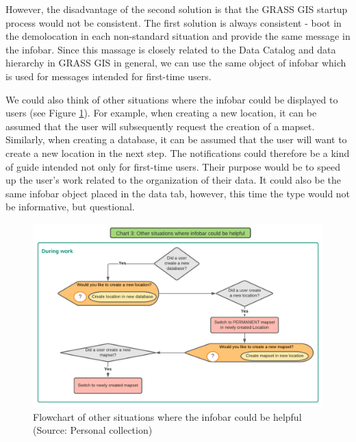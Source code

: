 \documentclass[a4paper,10pt,twoside]{article}
\begin{document}
\noindent However, the disadvantage of the second solution is that the
GRASS GIS startup process would not be consistent. The first solution
is always consistent - boot in the demolocation in each non-standard
situation and provide the same message in the infobar. Since this
massage is closely related to the Data Catalog and data hierarchy in
GRASS GIS in general, we can use the same object of infobar which is
used for messages intended for first-time users.

We could also think of other situations where the infobar could be
displayed to users (see Figure \ref{fig:other_situations}). For
example, when creating a new location, it can be assumed that the user
will subsequently request the creation of a mapset. Similarly, when
creating a database, it can be assumed that the user will want to
create a new location in the next step. The notifications could
therefore be a kind of guide intended not only for first-time
users. Their purpose would be to speed up the user's work related to
the organization of their data. It could also be the same infobar
object placed in the data tab, however, this time the type would not
be informative, but questional.

\vspace{0.3cm}
\begin{figure}[hbt!] 
\begin{center}
\includegraphics[width=17cm]{../pictures/other_situations.png} 
\caption[Flowchart of other situations where the infobar could be helpful]{Flowchart of other situations where the infobar could be helpful (Source: Personal collection)}
\label{fig:other_situations}
\end{center}
\end{figure}
\end{document}
